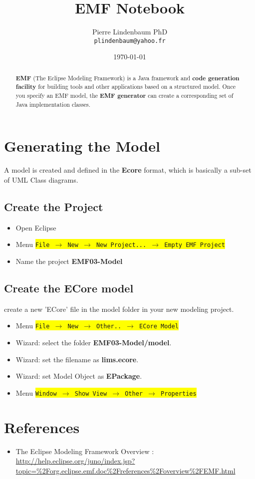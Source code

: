 \documentclass{article}
\date{\today}
\title{EMF Notebook}
\author{Pierre Lindenbaum PhD\\\texttt{plindenbaum@yahoo.fr}}
\newcommand{\menu}[1]{\colorbox{yellow}{\texttt{#1}}}
\def\emf{\textbf{EMF} }
\begin{document}
\maketitle

\begin{abstract}
\emf (The Eclipse Modeling Framework) is a Java framework and \textbf{code generation facility} for building tools and other applications based on a structured model.  Once you specify an EMF model, the \textbf{EMF generator} can create a corresponding set of Java implementation classes. 
\end{abstract}

\section{Generating the Model}
A model is created and defined in the \textbf{Ecore} format, which is basically a sub-set of UML Class diagrams.\\
\subsection{Create the Project}
\begin{itemize}
\item Open Eclipse
\item Menu \menu{File $\rightarrow$  New  $\rightarrow$ New Project... $\rightarrow$ Empty EMF Project}
\item Name the project \textbf{EMF03-Model}
\end{itemize}
\subsection{Create the ECore model}
create a new 'ECore' file in the model folder in your new modeling project.
\begin{itemize}
\item Menu \menu{File $\rightarrow$  New  $\rightarrow$ Other.. $\rightarrow$ ECore Model}
\item Wizard: select the folder \textbf{EMF03-Model/model}.
\item Wizard: set the filename as \textbf{lims.ecore}.
\item Wizard: set Model Object as  \textbf{EPackage}.
\item Menu \menu{Window  $\rightarrow$ Show View $\rightarrow$ Other $\rightarrow$ Properties}
\end{itemize}




\section{References}
\begin{itemize}
\item The Eclipse Modeling Framework Overview : \url{http://help.eclipse.org/juno/index.jsp?topic=%2Forg.eclipse.emf.doc%2Freferences%2Foverview%2FEMF.html}
\end{itemize}
\end{document}
